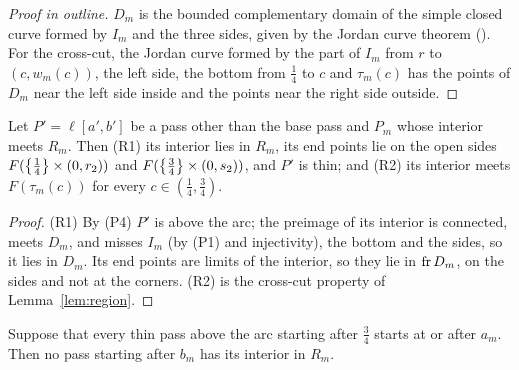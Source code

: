 \begin{proof}[Proof in outline]
$D_m$ is the bounded complementary domain of the simple closed curve formed by $I_m$ and the three sides, given by the Jordan curve
theorem (). For the cross-cut, the Jordan curve formed by the part of $I_m$ from $r$ to $(c,w_m(c))$, the left side, the
bottom from $\frac14$ to $c$ and $\tau_m(c)$ has the points of $D_m$ near the left side inside and the points near the right side outside.
\end{proof}


\begin{lemma}\label{lem:R1R2}
Let $P'=\ell[a',b']$ be a pass other than the base pass and $P_m$ whose interior meets $R_m$. Then (R1) its interior lies in $R_m$, its end
points lie on the open sides $F(\left\{ \frac14 \right\}\times(0,r_2))$ and $F(\left\{ \frac34 \right\}\times(0,s_2))$, and $P'$ is thin; and (R2) its interior meets $F(\tau_m(c))$
for every $c\in(\frac14,\frac34)$.
\end{lemma}

\begin{proof}
(R1) By (P4) $P'$ is above the arc; the preimage of its interior is connected, meets $D_m$, and misses $I_m$ (by (P1) and injectivity), the
bottom and the sides, so it lies in $D_m$. Its end points are limits of the interior, so they lie in $\operatorname{fr} D_m$, on the sides and not at the
corners. (R2) is the cross-cut property of Lemma~\ref{lem:region}.
\end{proof}


\begin{theorem}\label{thm:trap}
Suppose that every thin pass above the arc starting after $\frac34$ starts at or after $a_m$. Then no pass starting after $b_m$ has its
interior in $R_m$.
\end{theorem}

